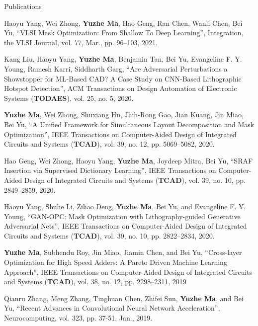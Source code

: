 \begin{rSection}{Publications}
\begin{description}[font=\normalfont]
\item[{[J9]}]{
        Haoyu Yang, Wei Zhong, \textbf{Yuzhe Ma}, Hao Geng, Ran Chen, Wanli Chen, Bei Yu,
        ``VLSI Mask Optimization: From Shallow To Deep Learning'',
        Integration, the VLSI Journal, vol. 77, Mar., pp. 96–103, 2021.
    }

\item[{[J8]}]{
        Kang Liu, Haoyu Yang, \textbf{Yuzhe Ma}, Benjamin Tan, Bei Yu, Evangeline F. Y. Young, Ramesh Karri, Siddharth Garg,
        ``Are Adversarial Perturbations a Showstopper for ML-Based CAD? A Case Study on CNN-Based Lithographic Hotspot Detection'',
        ACM Transactions on Design Automation of Electronic Systems (\textbf{TODAES}), vol. 25, no. 5, 2020.
}


\item[{[J7]}]{
        \textbf{Yuzhe Ma}, Wei Zhong, Shuxiang Hu, Jhih-Rong Gao, Jian Kuang, Jin Miao, Bei Yu,
        ``A Unified Framework for Simultaneous Layout Decomposition and Mask Optimization'',
        IEEE Transactions on Computer-Aided Design of Integrated Circuits and Systems (\textbf{TCAD}), vol. 39, no. 12, pp. 5069--5082, 2020.
}

\item[{[J6]}]{
     Hao Geng, Wei Zhong, Haoyu Yang, \textbf{Yuzhe Ma}, Joydeep Mitra, Bei Yu,
        ``SRAF Insertion via Supervised Dictionary Learning'',
        IEEE Transactions on Computer-Aided Design of Integrated Circuits and Systems (\textbf{TCAD}), vol. 39, no. 10, pp. 2849--2859, 2020.
}

\item[{[J5]}]{
    Haoyu Yang, Shuhe Li, Zihao Deng, \textbf{Yuzhe Ma}, Bei Yu, and Evangeline F. Y. Young,
    ``GAN-OPC: Mask Optimization with Lithography-guided Generative Adversarial Nets'',
     IEEE Transactions on Computer-Aided Design of Integrated Circuits and Systems (\textbf{TCAD}), vol. 39, no. 10, pp. 2822--2834, 2020.
}

\item[{[J4]}]{
	\textbf{Yuzhe Ma}, Subhendu Roy, Jin Miao, Jiamin Chen, and Bei Yu,
	``Cross-layer Optimization for High Speed Adders: A Pareto Driven Machine Learning Approach'',
    IEEE Transactions on Computer-Aided Design of Integrated Circuits and Systems (\textbf{TCAD}), vol. 38, no. 12, pp. 2298--2311, 2019
}

\item[{[J3]}]{
	Qianru Zhang, Meng Zhang, Tinghuan Chen, Zhifei Sun, \textbf{Yuzhe Ma}, and Bei Yu,
	``Recent Advances in Convolutional Neural Network Acceleration'',
	Neurocomputing, vol. 323, pp. 37-51, Jan., 2019.
}


\end{description}
\end{rSection}

